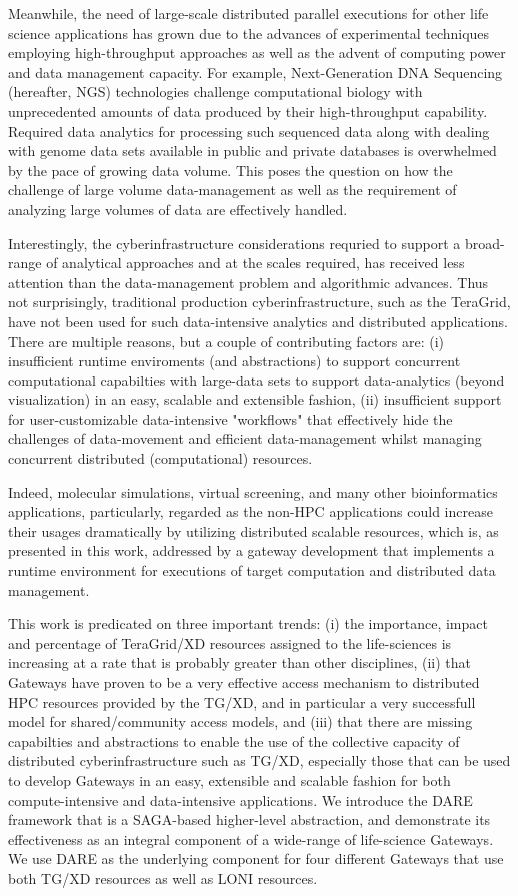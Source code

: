 \documentclass{sig-alternate}
\begin{document}
Meanwhile, the need of large-scale distributed parallel executions for
other life science applications has grown due to the advances of
experimental techniques employing high-throughput approaches as well as
the advent of computing power and data management capacity.  For
example, Next-Generation DNA Sequencing (hereafter, NGS) technologies
challenge computational biology with unprecedented amounts of data
produced by their high-throughput capability.  Required data analytics
for processing such sequenced data along with dealing with genome data
sets available in public and private databases is overwhelmed by the
pace of growing data volume.  This poses the question on how the
challenge of large volume data-management as well as the requirement
of analyzing large volumes of data are effectively handled.

Interestingly, the cyberinfrastructure considerations requried to
support a broad-range of analytical approaches and at the scales
required, has received less attention than the data-management problem
and algorithmic advances.  Thus not surprisingly, traditional
production cyberinfrastructure, such as the TeraGrid, have not been
used for such data-intensive analytics and distributed applications. There are multiple reasons,
but a couple of contributing factors are: (i) insufficient runtime
enviroments (and abstractions) to support concurrent computational
capabilties with large-data sets to support data-analytics (beyond
visualization) in an easy, scalable and extensible fashion, (ii)
insufficient support for user-customizable data-intensive "workflows"
that effectively hide the challenges of data-movement and efficient
data-management whilst managing concurrent distributed (computational)
resources.

Indeed, molecular simulations, virtual screening, and many other bioinformatics applications, particularly, regarded as the non-HPC applications could increase their usages dramatically by utilizing distributed scalable resources, which is, as presented in this work, addressed by a gateway development that implements a runtime environment for executions of target computation and distributed data management.

This work is predicated on three important trends: (i) the importance,
impact and percentage of TeraGrid/XD resources assigned to the
life-sciences is increasing at a rate that is probably greater than
other disciplines, (ii) that Gateways have proven to be a very
effective access mechanism to distributed HPC resources provided by
the TG/XD, and in particular a very successfull model for
shared/community access models, and (iii) that there are missing
capabilties and abstractions to enable the use of the collective
capacity of distributed cyberinfrastructure such as TG/XD, especially
those that can be used to develop Gateways in an easy, extensible and
scalable fashion for both compute-intensive and data-intensive
applications. We introduce the DARE framework that is a SAGA-based
higher-level abstraction, and demonstrate its effectiveness as an
integral component of a wide-range of life-science Gateways. We
use DARE as the underlying component for four different
Gateways that use both TG/XD resources as well as LONI resources.
\end{document}
